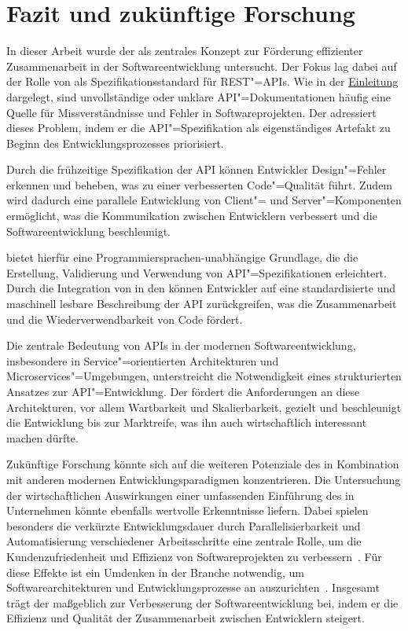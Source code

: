 \chapter{Fazit und zukünftige Forschung}
In dieser Arbeit wurde der \AFA als zentrales Konzept zur Förderung effizienter Zusammenarbeit in der Softwareentwicklung untersucht.
Der Fokus lag dabei auf der Rolle von \OA als Spezifikationsstandard für \ac{REST}"=\acp{API}.
Wie in der \hyperref[ch:introduction]{Einleitung} dargelegt, sind unvollständige oder unklare \ac{API}"=Dokumentationen häufig eine Quelle für Missverständnisse und Fehler in Softwareprojekten.
Der \AFA adressiert dieses Problem, indem er die \ac{API}"=Spezifikation als eigenständiges Artefakt zu Beginn des Entwicklungsprozesses priorisiert.

Durch die frühzeitige Spezifikation der \ac{API} können Entwickler Design"=Fehler erkennen und beheben, was zu einer verbesserten Code"=Qualität führt.
Zudem wird dadurch eine parallele Entwicklung von Client"= und Server"=Komponenten ermöglicht, was die Kommunikation zwischen Entwicklern verbessert und die Softwareentwicklung beschleunigt.

\OA bietet hierfür eine Programmiersprachen-unabhängige Grundlage, die die Erstellung, Validierung und Verwendung von \ac{API}"=Spezifikationen erleichtert.
Durch die Integration von \OA in den \AFA können Entwickler auf eine standardisierte und maschinell lesbare Beschreibung der \ac{API} zurückgreifen, was die Zusammenarbeit und die Wiederverwendbarkeit von Code fördert.

Die zentrale Bedeutung von \acp{API} in der modernen Softwareentwicklung, insbesondere in Service"=orientierten Architekturen und Microservices"=Umgebungen, unterstreicht die Notwendigkeit eines strukturierten Ansatzes zur \ac{API}"=Entwicklung.
Der \AFA fördert die Anforderungen an diese Architekturen, vor allem Wartbarkeit und Skalierbarkeit, gezielt und beschleunigt die Entwicklung bis zur Marktreife, was ihn auch wirtschaftlich interessant machen dürfte.

Zukünftige Forschung könnte sich auf die weiteren Potenziale des \AFAes in Kombination mit anderen modernen Entwicklungsparadigmen konzentrieren.
Die Untersuchung der wirtschaftlichen Auswirkungen einer umfassenden Einführung des \AFAes in Unternehmen könnte ebenfalls wertvolle Erkenntnisse liefern.
Dabei spielen besonders die verkürzte Entwicklungsdauer durch Parallelisierbarkeit und Automatisierung verschiedener Arbeitsschritte eine zentrale Rolle, um die Kundenzufriedenheit und Effizienz von Softwareprojekten zu verbessern~\cites[77]{bea22}[355,360]{de23}.
Für diese Effekte ist ein Umdenken in der Branche notwendig, um Softwarearchitekturen und Entwicklungsprozesse an \AF auszurichten~\cites[2]{kul23}[361]{de23}.
Insgesamt trägt der \AFA maßgeblich zur Verbesserung der Softwareentwicklung bei, indem er die Effizienz und Qualität der Zusammenarbeit zwischen Entwicklern steigert.